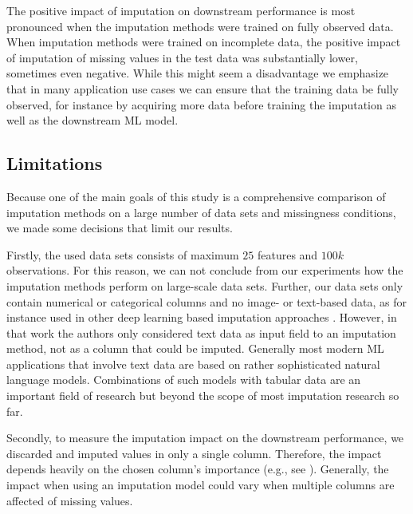 The positive impact of imputation on downstream performance is most pronounced when the imputation methods were trained on fully observed data. When imputation methods were trained on incomplete data, the positive impact of imputation of missing values in the test data was substantially lower, sometimes even negative. While this might seem a disadvantage we emphasize that in many application use cases we can ensure that the training data be fully observed, for instance by acquiring more data before training the imputation as well as the downstream ML model.


\subsection{Limitations}
\label{sec:limitations}
%
Because one of the main goals of this study is a comprehensive comparison of imputation methods on a large number of data sets and missingness conditions, we made some decisions that limit our results.

Firstly, the used data sets consists of maximum $25$ features and $100k$ observations. For this reason, we can not conclude from our experiments how the imputation methods perform on large-scale data sets. Further, our data sets only contain numerical or categorical columns and no image- or text-based data, as for instance used in other deep learning based imputation approaches \citep{Biessmann2018a}. However, in that work the authors only considered text data as input field to an imputation method, not as a column that could be imputed. Generally most modern ML applications that involve text data are based on rather sophisticated natural language models. Combinations of such models with tabular data are an important field of research \citep{Yin2020} but beyond the scope of most imputation research so far.

Secondly, to measure the imputation impact on the downstream performance, we discarded and imputed values in only a single column. Therefore, the impact depends heavily on the chosen column's importance (e.g., see \cite{Jenga}). Generally, the impact when using an imputation model could vary when multiple columns are affected of missing values.
